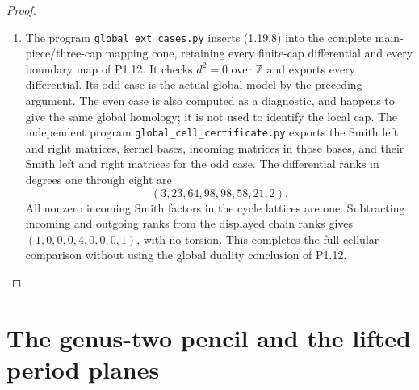 \documentclass[11pt,a4paper]{article}
\theoremstyle{definition}
\begin{document}
\begin{proof}
\begin{enumerate}[label=\arabic*.]
\item The program \texttt{global\_ext\_cases.py} inserts (1.19.8) into
the complete main-piece/three-cap mapping cone, retaining every
finite-cap differential and every boundary map of P1.12.
It checks $d^2=0$ over $\mathbb Z$ and exports every differential.
Its odd case is the actual global model by the preceding argument.
The even case is also computed as a diagnostic, and happens to give
the same global homology; it is not used to identify the local cap.
The independent program \texttt{global\_cell\_certificate.py}
exports the Smith left and right matrices, kernel bases, incoming
matrices in those bases, and their Smith left and right matrices
for the odd case.  The differential ranks in degrees one through
eight are
\[
                 (3,23,64,98,98,58,21,2).
\]
All nonzero incoming Smith factors in the cycle lattices are one.
Subtracting incoming and outgoing ranks from the displayed chain
ranks gives $(1,0,0,0,4,0,0,0,1)$, with no torsion.
This completes the full cellular comparison without using the
global duality conclusion of P1.12.

\end{enumerate}
\end{proof}


\section{The genus-two pencil and the lifted period planes}
\end{document}

